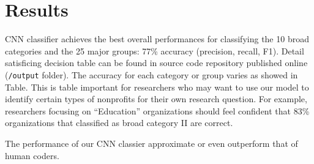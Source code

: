 \documentclass[11pt]{article}
\begin{document}
\section{Results}

CNN classifier achieves the best overall performances for classifying the 10 broad categories and the 25 major groups: 77\% accuracy (precision, recall, F1). Detail satisficing decision table can be found in source code repository published online (\texttt{/output} folder). The accuracy for each category or group varies as showed in Table. This is table important for researchers who may want to use our model to identify certain types of nonprofits for their own research question. For example, researchers focusing on ``Education'' organizations should feel confident that 83\% organizations that classified as broad category II are correct.

The performance of our CNN classier approximate or even outperform that of human coders.


\sloppy
\printbibliography
\end{document}
